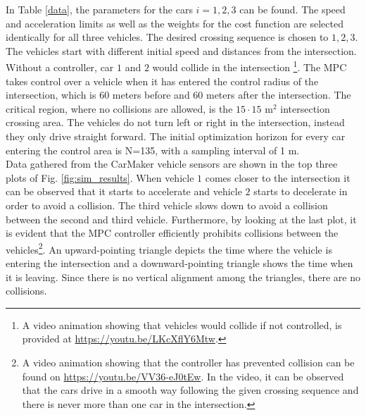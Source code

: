 \documentclass[letterpaper,10pt,conference]{ieeeconf}
\begin{document}
In Table \ref{data}, the parameters for the cars $i=1,2,3$ can be found. The speed and acceleration limits as well as the weights for the cost function are selected identically for all three vehicles. The desired crossing sequence is chosen to $1,2,3$. The vehicles start with different initial speed and distances from the intersection. Without a controller, car $1$ and $2$ would collide in the intersection \footnote{A video animation showing that vehicles would collide if not controlled, is provided at \url{https://youtu.be/LKcXflY6Mtw}.}. The MPC takes control over a vehicle when it has entered the control radius of the intersection, which is $60$ meters before and $60$ meters after the intersection. The critical region, where no collisions are allowed, is the $15\cdot15$ m$^2$ intersection crossing area. The vehicles do not turn left or right in the intersection, instead they only drive straight forward. The initial optimization horizon for every car entering the control area is N=135, with a sampling interval of 1 m. \\ \indent
Data gathered from the CarMaker vehicle sensors are shown in the top three plots of Fig. \ref{fig:sim_results}. When vehicle $1$ comes closer to the intersection it can be observed that it starts to accelerate and vehicle $2$ starts to decelerate in order to avoid a collision. The third vehicle slows down to avoid a collision between the second and third vehicle.
Furthermore, by looking at the last plot, it is evident that the MPC controller efficiently prohibits collisions  between the vehicles\footnote{A video animation showing that the controller has prevented collision can be found on \url{https://youtu.be/VV36-eJ0tEw}. In the video, it can be observed that the cars drive in a smooth way following the given crossing sequence and there is never more than one car in the intersection.}. An upward-pointing triangle depicts the time where the vehicle is entering the intersection and a downward-pointing triangle shows the time when it is leaving. Since there is no vertical alignment among the triangles, there are no collisions.
\end{document}

